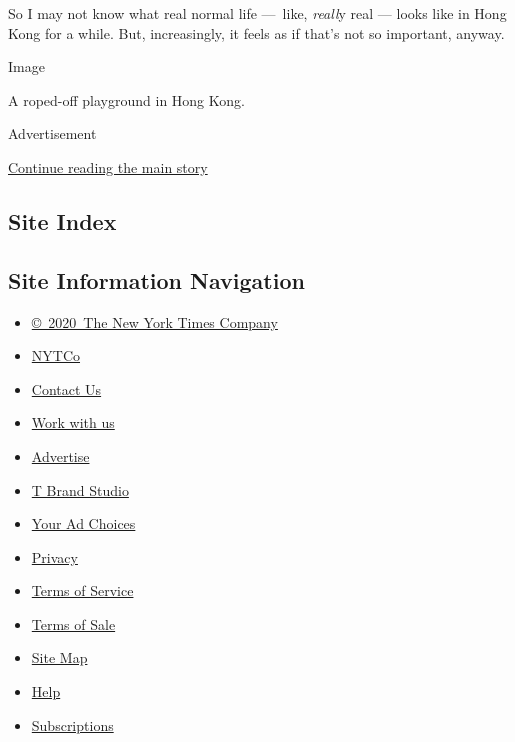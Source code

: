 So I may not know what real normal life ---~like, \emph{reall}y real ---
looks like in Hong Kong for a while. But, increasingly, it feels as if
that's not so important, anyway.

Image

A roped-off playground in Hong Kong.

Advertisement

\protect\hyperlink{after-bottom}{Continue reading the main story}

\hypertarget{site-index}{%
\subsection{Site Index}\label{site-index}}

\hypertarget{site-information-navigation}{%
\subsection{Site Information
Navigation}\label{site-information-navigation}}

\begin{itemize}
\tightlist
\item
  \href{https://help.nytimes3xbfgragh.onion/hc/en-us/articles/115014792127-Copyright-notice}{©~2020~The
  New York Times Company}
\end{itemize}

\begin{itemize}
\tightlist
\item
  \href{https://www.nytco.com/}{NYTCo}
\item
  \href{https://help.nytimes3xbfgragh.onion/hc/en-us/articles/115015385887-Contact-Us}{Contact
  Us}
\item
  \href{https://www.nytco.com/careers/}{Work with us}
\item
  \href{https://nytmediakit.com/}{Advertise}
\item
  \href{http://www.tbrandstudio.com/}{T Brand Studio}
\item
  \href{https://www.nytimes3xbfgragh.onion/privacy/cookie-policy\#how-do-i-manage-trackers}{Your
  Ad Choices}
\item
  \href{https://www.nytimes3xbfgragh.onion/privacy}{Privacy}
\item
  \href{https://help.nytimes3xbfgragh.onion/hc/en-us/articles/115014893428-Terms-of-service}{Terms
  of Service}
\item
  \href{https://help.nytimes3xbfgragh.onion/hc/en-us/articles/115014893968-Terms-of-sale}{Terms
  of Sale}
\item
  \href{https://spiderbites.nytimes3xbfgragh.onion}{Site Map}
\item
  \href{https://help.nytimes3xbfgragh.onion/hc/en-us}{Help}
\item
  \href{https://www.nytimes3xbfgragh.onion/subscription?campaignId=37WXW}{Subscriptions}
\end{itemize}
